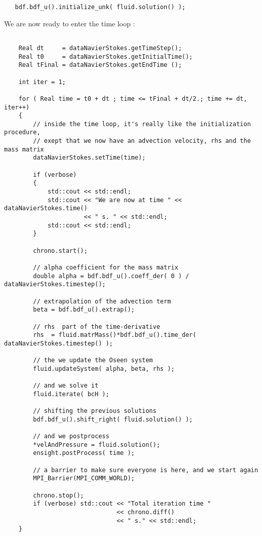 \begin{verbatim}
   bdf.bdf_u().initialize_unk( fluid.solution() );
\end{verbatim}

We are now ready to enter the time loop :

\begin{verbatim}

    Real dt     = dataNavierStokes.getTimeStep();
    Real t0     = dataNavierStokes.getInitialTime();
    Real tFinal = dataNavierStokes.getEndTime ();

    int iter = 1;

    for ( Real time = t0 + dt ; time <= tFinal + dt/2.; time += dt, iter++)
    {
        // inside the time loop, it's really like the initialization procedure,
        // exept that we now have an advection velocity, rhs and the mass matrix
        dataNavierStokes.setTime(time);

        if (verbose)
        {
            std::cout << std::endl;
            std::cout << "We are now at time " << dataNavierStokes.time()
                      << " s. " << std::endl;
            std::cout << std::endl;
        }

        chrono.start();

        // alpha coefficient for the mass matrix
        double alpha = bdf.bdf_u().coeff_der( 0 ) / dataNavierStokes.timestep();

        // extrapolation of the advection term
        beta = bdf.bdf_u().extrap();

        // rhs  part of the time-derivative
        rhs  = fluid.matrMass()*bdf.bdf_u().time_der( dataNavierStokes.timestep() );

        // the we update the Oseen system
        fluid.updateSystem( alpha, beta, rhs );

        // and we solve it
        fluid.iterate( bcH );

        // shifting the previous solutions
        bdf.bdf_u().shift_right( fluid.solution() );

        // and we postprocess
        *velAndPressure = fluid.solution();
        ensight.postProcess( time );

        // a barrier to make sure everyone is here, and we start again
        MPI_Barrier(MPI_COMM_WORLD);

        chrono.stop();
        if (verbose) std::cout << "Total iteration time "
                               << chrono.diff()
                               << " s." << std::endl;
    }

\end{verbatim}

